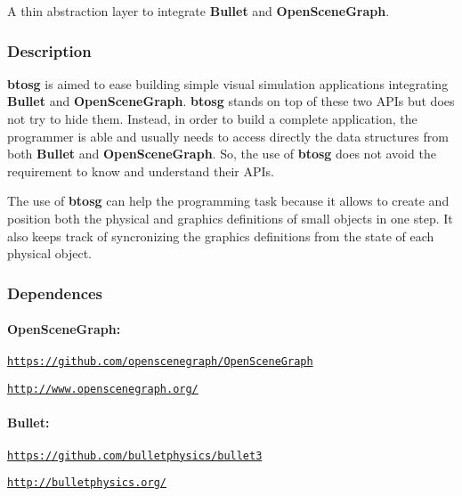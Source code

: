 A thin abstraction layer to integrate {\bfseries Bullet} and {\bfseries Open\+Scene\+Graph}.

\subsubsection*{Description}

{\bfseries btosg} is aimed to ease building simple visual simulation applications integrating {\bfseries Bullet} and {\bfseries Open\+Scene\+Graph}. {\bfseries btosg} stands on top of these two A\+P\+Is but does not try to hide them. Instead, in order to build a complete application, the programmer is able and usually needs to access directly the data structures from both {\bfseries Bullet} and {\bfseries Open\+Scene\+Graph}. So, the use of {\bfseries btosg} does not avoid the requirement to know and understand their A\+P\+Is.

The use of {\bfseries btosg} can help the programming task because it allows to create and position both the physical and graphics definitions of small objects in one step. It also keeps track of syncronizing the graphics definitions from the state of each physical object.

\subsubsection*{Dependences}

\paragraph*{Open\+Scene\+Graph\+:}


\begin{DoxyItemize}
\item \href{https://github.com/openscenegraph/OpenSceneGraph}{\tt https\+://github.\+com/openscenegraph/\+Open\+Scene\+Graph}
\item \href{http://www.openscenegraph.org/}{\tt http\+://www.\+openscenegraph.\+org/} \paragraph*{Bullet\+:}
\end{DoxyItemize}


\begin{DoxyItemize}
\item \href{https://github.com/bulletphysics/bullet3}{\tt https\+://github.\+com/bulletphysics/bullet3}
\item \href{http://bulletphysics.org/}{\tt http\+://bulletphysics.\+org/}
\end{DoxyItemize}

